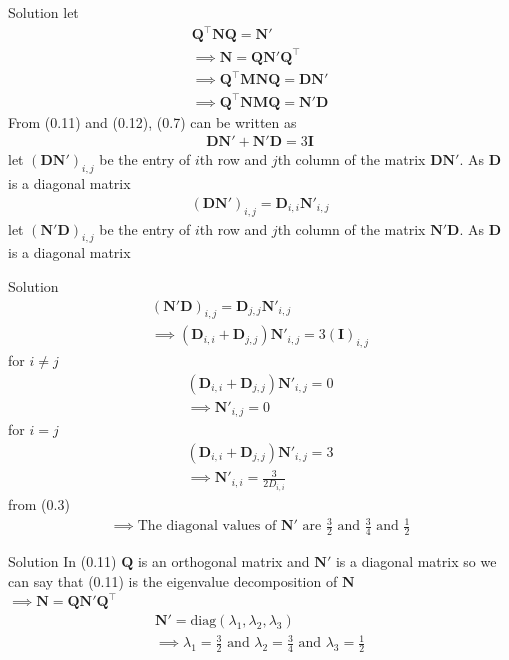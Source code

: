 \documentclass{beamer}
\numberwithin{equation}{section}
\providecommand{\brak}[1]{\ensuremath{\left(#1\right)}}
\theoremstyle{remark}
\let\vec\mathbf
\begin{document}
\begin{frame}{Solution}
let
\begin{align}
 \vec{Q}^\top\vec{N}\vec{Q}=\vec{N}'\\
 \implies \vec{N}=\vec{QN}'\vec{Q}^\top\\
 \implies \vec{Q}^\top\vec{MN}\vec{Q}=\vec{D}\vec{N}'\\
 \implies \vec{Q}^\top\vec{NM}\vec{Q}=\vec{N}'\vec{D}
\end{align}
From (0.11) and (0.12), (0.7) can be written as
\begin{align}
    \vec{D}\vec{N}' + \vec{N}'\vec{D}=3\vec{I}
\end{align}
let $\brak{\vec{D}\vec{N}'}_{i,j}$ be the entry of $i$th row and $j$th column of the matrix $\vec{D}\vec{N}'$.  As $\vec{D}$ is a diagonal matrix
\begin{align}
    \brak{\vec{D}\vec{N}'}_{i,j}=\vec{D}_{i,i}\vec{N}'_{i,j}
\end{align}
let $\brak{\vec{N}'\vec{D}}_{i,j}$ be the entry of $i$th row and $j$th column of the matrix $\vec{N}'\vec{D}$.  As $\vec{D}$ is a diagonal matrix
\end{frame}

\begin{frame}{Solution}
\begin{align}
    \brak{\vec{N}'\vec{D}}_{i,j}=\vec{D}_{j,j}\vec{N}'_{i,j}\\
    \implies \brak{\vec{D}_{i,i} + \vec{D}_{j,j}}\vec{N}'_{i,j}=3\brak{\vec{I}}_{i,j}
\end{align}
for $i\neq j$
\begin{align}
     \brak{\vec{D}_{i,i} + \vec{D}_{j,j}}\vec{N}'_{i,j}=0\\
   \implies  \vec{N}'_{i,j}=0
\end{align}
for $i=j$
\begin{align}
     \brak{\vec{D}_{i,i}+ \vec{D}_{j,j}}\vec{N}'_{i,j}=3\\
     \implies \vec{N}'_{i,i}=\frac{3}{2D_{i,i}}
\end{align}
from (0.3)
\begin{align}
    \implies \text{The diagonal values of } \vec{N}' \text{ are } \frac{3}{2} \text{ and } \frac{3}{4} \text{ and } \frac{1}{2}
\end{align}
\end{frame}

\begin{frame}{Solution}
In  (0.11) $\vec{Q}$ is an orthogonal matrix and $\vec{N}'$ is a diagonal matrix so we can say that (0.11) is the eigenvalue decomposition of $\vec{N}$\\
$\implies \vec{N}=\vec{QN}'\vec{Q}^\top$
\begin{align}
    \vec{N}'=\text{diag}\brak{\lambda_1,\lambda_2 ,\lambda_3}\\
    \implies \lambda_1=\frac{3}{2} \text{ and } \lambda_2=\frac{3}{4} \text{ and } \lambda_3=\frac{1}{2}
\end{align}
\end{frame}
\end{document}
